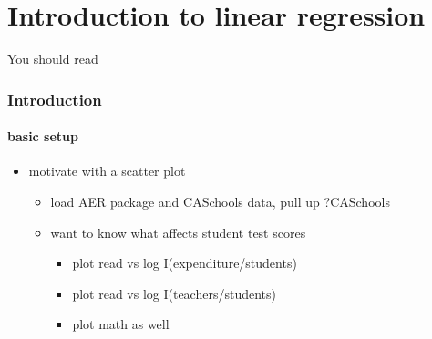 
\part*{Introduction to linear regression}%

You should read \citet{Fis_1926}

\section{Introduction}
\subsection{basic setup}

\begin{itemize}
\item motivate with a scatter plot
\begin{itemize}
\item load AER package and CASchools data, pull up ?CASchools
\item want to know what affects student test scores
\begin{itemize}
\item plot read vs log I(expenditure/students)
\item plot read vs log I(teachers/students)
\item plot math as well
\end{itemize}
\end{itemize}
\end{itemize}

